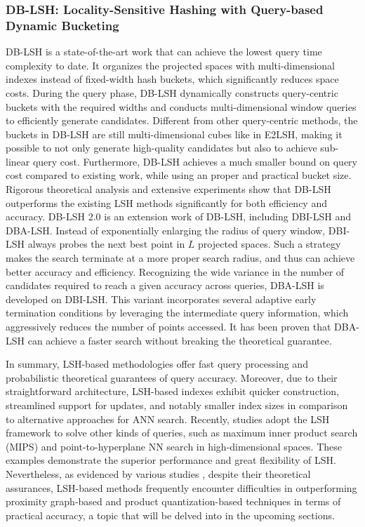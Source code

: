 \documentclass[11pt]{article}
\begin{document}
\subsubsection{DB-LSH: Locality-Sensitive Hashing with Query-based Dynamic Bucketing}
DB-LSH \cite{DBLP:conf/icde/TianZZ22} is a state-of-the-art work that can achieve the lowest query time complexity to date.  It organizes the projected spaces with multi-dimensional indexes instead of fixed-width hash buckets, which significantly reduces space costs.  During the query phase, DB-LSH dynamically constructs query-centric buckets with the required widths and conducts multi-dimensional window queries to  efficiently generate candidates. Different from other query-centric methods, the buckets in DB-LSH are still multi-dimensional cubes like in E2LSH, making it possible to not only generate
high-quality candidates but also to achieve sub-linear query cost. Furthermore, DB-LSH achieves a much smaller bound on query cost compared to existing work, while using an proper and practical bucket size. Rigorous theoretical analysis and extensive experiments show that DB-LSH outperforms the existing LSH methods significantly for both efficiency and accuracy. DB-LSH 2.0 \cite{DB-LSH2} is an extension work of DB-LSH, including DBI-LSH and DBA-LSH. Instead of exponentially enlarging the radius of query window,  DBI-LSH always probes the next best
point in $L$ projected spaces. Such a strategy makes the search terminate at a more proper search radius, and thus can achieve
better accuracy and efficiency. Recognizing the wide variance in the number of candidates required to reach a given accuracy across queries, DBA-LSH is developed on DBI-LSH. This variant incorporates several adaptive early termination conditions by leveraging the intermediate query information, which aggressively reduces the number of points accessed. It has been proven that DBA-LSH can achieve a faster search without breaking the theoretical guarantee.

In summary, LSH-based methodologies offer fast query processing and probabilistic theoretical guarantees of query accuracy.  Moreover, due to their straightforward architecture, LSH-based indexes exhibit quicker construction, streamlined support for updates, and notably smaller index sizes in comparison to alternative approaches for ANN search. Recently, studies adopt the LSH framework to solve other kinds of queries, such as maximum inner product search (MIPS) \cite{DBLP:journals/pvldb/ZhaoZYLXZJ23} and point-to-hyperplane NN search \cite{DBLP:conf/sigmod/HuangLT21} in high-dimensional spaces. These examples demonstrate the superior performance and great flexibility of LSH. Nevertheless, as evidenced by various studies \cite{benchmark}, despite their theoretical assurances, LSH-based methods frequently encounter difficulties in outperforming proximity graph-based and product quantization-based techniques in terms of practical accuracy, a topic that will be delved into in the upcoming sections.
\end{document}
